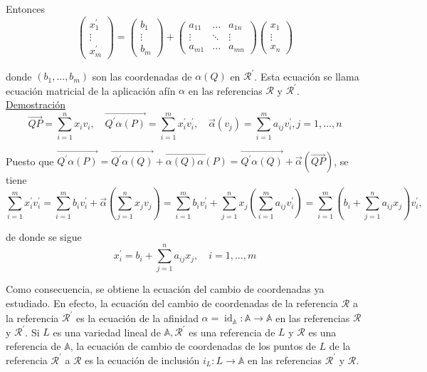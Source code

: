\documentclass[12pt, a4paper, ones, notitlepage, openany,titlepage]{article}
\newcommand{\demostracion}{\noindent\underline{Demostración}}
\begin{document}
\noindent Entonces
$$
\left(\begin{array}{c}
x_{1}^{\prime} \\
\vdots \\
x_{m}^{\prime}
\end{array}\right)=\left(\begin{array}{c}
b_{1} \\
\vdots \\
b_{m}
\end{array}\right)+\left(\begin{array}{ccc}
a_{11} & \ldots & a_{1 n} \\
\vdots & \ddots & \vdots \\
a_{m 1} & \ldots & a_{m n}
\end{array}\right)\left(\begin{array}{c}
x_{1} \\
\vdots \\
x_{n}
\end{array}\right)
$$

donde $\left(b_{1}, \ldots, b_{m}\right)$ son las coordenadas de $\alpha(Q)$ en $\mathcal{R}^{\prime}$. Esta ecuación se llama ecuación matricial de la aplicación afín $\alpha$ en las referencias $\mathcal{R}$ y $\mathcal{R}^{\prime}$.\\

\demostracion
$$
\overrightarrow{Q P}=\sum_{i=1}^{n} x_{i} v_{i}, \quad \overrightarrow{Q^{\prime} \alpha(P)}=\sum_{i=1}^{m} x_{i}^{\prime} v_{i}^{\prime}, \quad \overrightarrow{\alpha}\left(v_{j}\right)=\sum_{i=1}^{m} a_{i j} v_{i}^{\prime}, j=1, \ldots, n
$$

\noindent Puesto que $\overrightarrow{Q^{\prime} \alpha(P)}=\overrightarrow{Q^{\prime} \alpha(Q)}+\overrightarrow{\alpha(Q) \alpha(P)}=\overrightarrow{Q^{\prime} \alpha(Q)}+\overrightarrow{\alpha}(\overrightarrow{Q P})$, se tiene
$$
\sum_{i=1}^{m} x_{i}^{\prime} v_{i}^{\prime}=\sum_{i=1}^{m} b_{i} v_{i}^{\prime}+\overrightarrow{\alpha}\left(\sum_{j=1}^{n} x_{j} v_{j}\right)=\sum_{i=1}^{m} b_{i} v_{i}^{\prime}+\sum_{j=1}^{n} x_{j}\left(\sum_{i=1}^{m} a_{i j} v_{i}^{\prime}\right)=\sum_{i=1}^{m}\left(b_{i}+\sum_{j=1}^{n} a_{i j} x_{j}\right) v_{i}^{\prime},
$$

\noindent de donde se sigue
$$
x_{i}^{\prime}=b_{i}+\sum_{j=1}^{n} a_{i j} x_{j}, \quad i=1, \ldots, m
$$

Como consecuencia, se obtiene la ecuación del cambio de coordenadas ya estudiado. En efecto, la ecuación del cambio de coordenadas de la referencia $\mathcal{R}$ a la referencia $\mathcal{R}^{\prime}$ es la ecuación de la afinidad $\alpha=\operatorname{id}_{\mathbb{A}}: \mathbb{A} \rightarrow \mathbb{A}$ en las referencias $\mathcal{R}$ y $\mathcal{R}^{\prime}$. Si $L$ es una variedad lineal de $\mathbb{A}, \mathcal{R}^{\prime}$ es una referencia de $L$ y $\mathcal{R}$ es una referencia de $\mathbb{A}$, la ecuación de cambio de coordenadas de los puntos de $L$ de la referencia $\mathcal{R}^{\prime}$ a $\mathcal{R}$ es la ecuación de inclusión $i_{L}: L \rightarrow \mathbb{A}$ en las referencias $\mathcal{R}^{\prime}$ y $\mathcal{R}$.
\end{document}
